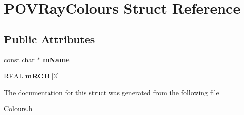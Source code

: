\hypertarget{struct_p_o_v_ray_colours}{}\section{P\+O\+V\+Ray\+Colours Struct Reference}
\label{struct_p_o_v_ray_colours}
\subsection*{Public Attributes}
\begin{DoxyCompactItemize}
\item 
\mbox{\label{struct_p_o_v_ray_colours_a542a4c3be055aceb3aecf6fd42b29da1}} 
const char $\ast$ {\bfseries m\+Name}
\item 
\mbox{\label{struct_p_o_v_ray_colours_a27f69d12b5f3691bf8afa396044f62d8}} 
R\+E\+AL {\bfseries m\+R\+GB} \mbox{[}3\mbox{]}
\end{DoxyCompactItemize}


The documentation for this struct was generated from the following file\+:\begin{DoxyCompactItemize}
\item 
Colours.\+h\end{DoxyCompactItemize}
